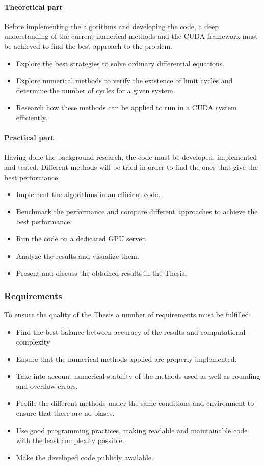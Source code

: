 \paragraph{Theoretical part} 

Before implementing the algorithms and developing the code, a deep understanding of the current numerical methods and the CUDA framework must be achieved to find the best approach to the problem.

\begin{itemize}
    \item Explore the best strategies to solve ordinary differential equations.
    \item Explore numerical methods to verify the existence of limit cycles and determine the number of cycles for a given system.
    \item Research how these methods can be applied to run in a CUDA system efficiently.
\end{itemize}

\paragraph{Practical part} Having done the background research, the code must be developed, implemented and tested. 
Different methods will be tried in order to find the ones that give the best performance.

\begin{itemize}
    \item Implement the algorithms in an efficient code.
    \item Benchmark the performance and compare different approaches to achieve the best performance.
    \item Run the code on a dedicated GPU server.
    \item Analyze the results and visualize them.
    \item Present and discuss the obtained results in the Thesis.
\end{itemize}

\subsubsection{Requirements}

To ensure the quality of the Thesis a number of requirements must be fulfilled:
\begin{itemize}
    \item Find the best balance between accuracy of the results and computational complexity
    \item Ensure that the numerical methods applied are properly implemented.
    \item Take into account numerical stability of the methods used as well as rounding and overflow errors.
    \item Profile the different methods under the same conditions and environment to ensure that there are no biases.
    \item Use good programming practices, making readable and maintainable code with the least complexity possible.
    \item Make the developed code publicly available.
\end{itemize}


